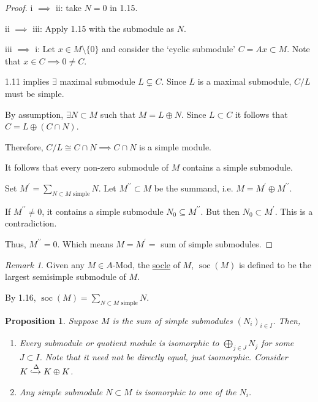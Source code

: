 \documentclass{article}
\theoremstyle{definition}
\theoremstyle{plain}
\newtheorem{proposition}[theorem]{Proposition}
\theoremstyle{remark}
\newtheorem*{remark*}{Remark}
\begin{document}
    \begin{proof}
        i \(\implies\) ii: take \(N = 0\) in 1.15.

        ii \(\implies\) iii: Apply 1.15 with the submodule as \(N\).

        iii \(\implies\) i: Let \(x\in M \setminus \{ 0 \} \) and consider the `cyclic submodule' \(C = Ax \subset M\). Note that \(x\in C \implies 0\neq C\).

        1.11 implies \(\exists\) maximal submodule \(L \subsetneq C\). Since \(L\) is a maximal submodule, \(C / L\) must be simple.

        By assumption, \(\exists N \subset M\) such that \(M = L \oplus N\). Since \(L \subset C\) it follows that \(C = L \oplus (C \cap N)\).

        Therefore, \(C / L \cong C \cap N \implies C \cap N\) is a simple module.

        It follows that every non-zero submodule of \(M\) contains a simple submodule.

        Set \(M^{\prime} = \sum_{N \subset M \text{ simple}} N\). Let \(M^{\prime\prime} \subset M\) be the summand, i.e. \(M = M^{\prime} \oplus M^{\prime\prime}\).
        
        If \(M^{\prime\prime} \neq 0\), it contains a simple submodule \(N_0 \subseteq M^{\prime\prime}\). But then \(N_0 \subset M^{\prime}\). This is a contradiction.
        
        Thus, \(M^{\prime\prime} = 0\). Which means \(M = M^{\prime} =\) sum of simple submodules.
    \end{proof}

    \begin{remark*}
        Given any \(M \in A\text{-Mod}\), the \underline{socle} of \(M\), \(\operatorname{soc}(M)\) is defined to be the largest semisimple submodule of \(M\).
        
        By 1.16, \(\operatorname{soc}(M) = \sum_{N \subset M \text{ simple}} N\). 
    \end{remark*}

    \begin{proposition}
        Suppose \(M\) is the sum of simple submodules \((N_i)_{i\in I}\). Then,

        \begin{enumerate}[label=\roman*)]
            \item Every submodule or quotient module is isomorphic to \(\bigoplus_{j\in J} N_j\) for some \(J \subset I\). Note that it need not be directly equal, just isomorphic. Consider \(K \xhookrightarrow{\Delta} K \oplus K\).
            \item Any simple submodule \(N \subset M\) is isomorphic to one of the \(N_i\). 
        \end{enumerate} 
    \end{proposition}
\end{document}
